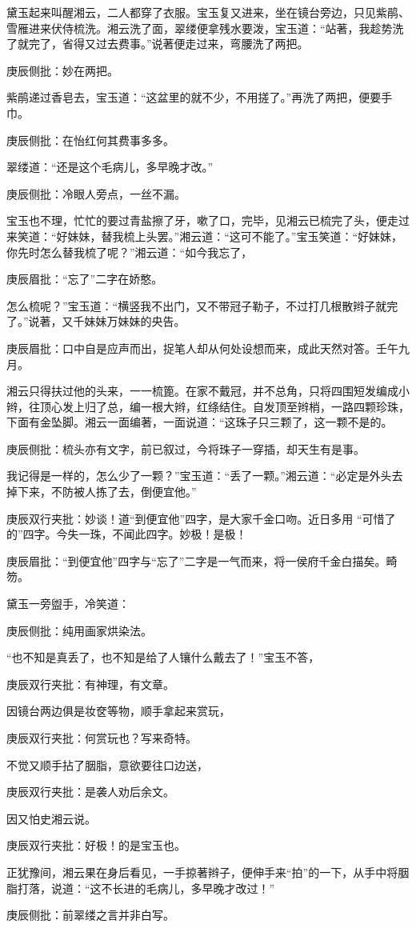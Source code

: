 \begin{parag}


    黛玉起来叫醒湘云，二人都穿了衣服。宝玉复又进来，坐在镜台旁边，只见紫鹃、雪雁进来伏侍梳洗。湘云洗了面，翠缕便拿残水要泼，宝玉道：“站著，我趁势洗了就完了，省得又过去费事。”说著便走过来，弯腰洗了两把。\begin{note}庚辰侧批：妙在两把。\end{note}紫鹃递过香皂去，宝玉道：“这盆里的就不少，不用搓了。”再洗了两把，便要手巾。\begin{note}庚辰侧批：在怡红何其费事多多。\end{note}翠缕道：“还是这个毛病儿，多早晚才改。”\begin{note}庚辰侧批：冷眼人旁点，一丝不漏。\end{note}宝玉也不理，忙忙的要过青盐擦了牙，嗽了口，完毕，见湘云已梳完了头，便走过来笑道：“好妹妹，替我梳上头罢。”湘云道：“这可不能了。”宝玉笑道：“好妹妹，你先时怎么替我梳了呢？”湘云道：“如今我忘了，\begin{note}庚辰眉批：“忘了”二字在娇憨。\end{note}怎么梳呢？”宝玉道：“横竖我不出门，又不带冠子勒子，不过打几根散辫子就完了。”说著，又千妹妹万妹妹的央告。\begin{note}庚辰眉批：口中自是应声而出，捉笔人却从何处设想而来，成此天然对答。壬午九月。\end{note}湘云只得扶过他的头来，一一梳篦。在家不戴冠，并不总角，只将四围短发编成小辫，往顶心发上归了总，编一根大辫，红绦结住。自发顶至辫梢，一路四颗珍珠，下面有金坠脚。湘云一面编著，一面说道：“这珠子只三颗了，这一颗不是的。\begin{note}庚辰侧批：梳头亦有文字，前已叙过，今将珠子一穿插，却天生有是事。\end{note}我记得是一样的，怎么少了一颗？”宝玉道：“丢了一颗。”湘云道：“必定是外头去掉下来，不防被人拣了去，倒便宜他。”\begin{note}庚辰双行夹批：妙谈！道“到便宜他”四字，是大家千金口吻。近日多用 “可惜了的”四字。今失一珠，不闻此四字。妙极！是极！\end{note}\begin{note}庚辰眉批：“到便宜他”四字与“忘了”二字是一气而来，将一侯府千金白描矣。畸笏。\end{note}黛玉一旁盥手，冷笑道：\begin{note}庚辰侧批：纯用画家烘染法。\end{note}“也不知是真丢了，也不知是给了人镶什么戴去了！”宝玉不答，\begin{note}庚辰双行夹批：有神理，有文章。\end{note}因镜台两边俱是妆奁等物，顺手拿起来赏玩，\begin{note}庚辰双行夹批：何赏玩也？写来奇特。\end{note}不觉又顺手拈了胭脂，意欲要往口边送，\begin{note}庚辰双行夹批：是袭人劝后余文。\end{note}因又怕史湘云说。\begin{note}庚辰双行夹批：好极！的是宝玉也。\end{note}正犹豫间，湘云果在身后看见，一手掠著辫子，便伸手来“拍”的一下，从手中将胭脂打落，说道：“这不长进的毛病儿，多早晚才改过！”\begin{note}庚辰侧批：前翠缕之言并非白写。\end{note}

\end{parag}
